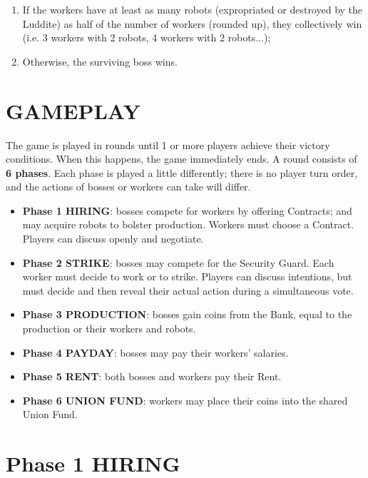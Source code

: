         \begin{enumerate}
            \item If the workers have at least as many robots (expropriated or destroyed by the
            Luddite) as half of the number of workers (rounded up), they collectively win
            (i.e. 3 workers with 2 robots, 4 workers with 2 robots...);
            \item Otherwise, the surviving boss wins.
        \end{enumerate}

\section{GAMEPLAY}

    The game is played in rounds until 1 or more players achieve their victory conditions.
    When this happens, the game immediately ends.
    A round consists of \textbf{6 phases}. Each phase is played a little differently; there is no
    player turn order, and the actions of bosses or workers can take will differ.

    \begin{itemize}
        \item \textbf{Phase 1 HIRING}: bosses compete for workers by offering Contracts; and
        may acquire robots to bolster production. Workers must choose a Contract.
        Players can discuss openly and negotiate.
        \item \textbf{Phase 2 STRIKE}: bosses may compete for the Security Guard. Each worker
        must decide to work or to strike. Players can discuss intentions, but must
        decide and then reveal their actual action during a simultaneous vote.
        \item \textbf{Phase 3 PRODUCTION}: bosses gain coins from the Bank, equal to the production
        or their workers and robots.
        \item \textbf{Phase 4 PAYDAY}: bosses may pay their workers' salaries.
        \item \textbf{Phase 5 RENT}: both bosses and workers pay their Rent.
        \item \textbf{Phase 6 UNION FUND}: workers may place their coins into the shared Union
        Fund.
    \end{itemize}



\section{Phase 1 HIRING}

